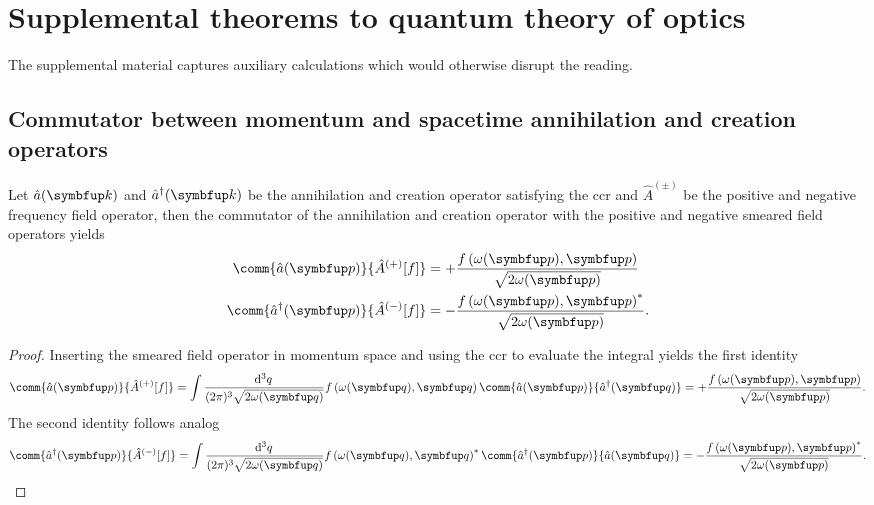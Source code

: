 \chapter{Supplemental theorems to quantum theory of optics}

The supplemental material captures auxiliary calculations which would otherwise disrupt the reading.

\section{Commutator between momentum and spacetime annihilation and creation operators}

\begin{lemma}\label{th:annihilation_field_commutators}
	Let $\hat{a}(\vb{k})$ and $\hat{a}^\dagger(\vb{k})$ be the annihilation and creation operator satisfying the \gls{ccr} and $\hat{A}^{(\pm)}$ be the positive and negative frequency field operator, then the commutator of the annihilation and creation operator with the positive and negative smeared field operators yields
	\begin{align}
		\comm{\hat{a}(\vb{p})}{\hat{A}^{(+)}[f]}
		&=
		+\frac{f\left(\omega(\vb{p}),\vb{p}\right)}{\sqrt{2\omega(\vb{p})}}
		\\
		\comm{\hat{a}^\dagger(\vb{p})}{\hat{A}^{(-)}[f]}
		&=
		-\frac{f\left(\omega(\vb{p}),\vb{p}\right)^*}{\sqrt{2\omega(\vb{p})}}
		.
	\end{align}
\end{lemma}
\begin{proof}
	Inserting the smeared field operator in momentum space and using the \gls{ccr} to evaluate the integral yields the first identity
	\begin{equation}
		\comm{\hat{a}(\vb{p})}{\hat{A}^{(+)}[f]}
		=
		\int\frac{\dd[3]{q}}{(2\pi)^3\sqrt{2\omega(\vb{q})}}
		f\left(\omega(\vb{q}),\vb{q}\right)
		\comm{\hat{a}(\vb{p})}{\hat{a}^\dagger(\vb{q})}
		=
		+\frac{f\left(\omega(\vb{p}),\vb{p}\right)}{\sqrt{2\omega(\vb{p})}}
		.
	\end{equation}
	The second identity follows analog
	\begin{equation}
		\comm{\hat{a}^\dagger(\vb{p})}{\hat{A}^{(-)}[f]}
		=
		\int\frac{\dd[3]{q}}{(2\pi)^3\sqrt{2\omega(\vb{q})}}
		f\left(\omega(\vb{q}),\vb{q}\right)^*
		\comm{\hat{a}^\dagger(\vb{p})}{\hat{a}(\vb{q})}
		=
		-\frac{f\left(\omega(\vb{p}),\vb{p}\right)^*}{\sqrt{2\omega(\vb{p})}}
		.
	\end{equation}
\end{proof}


